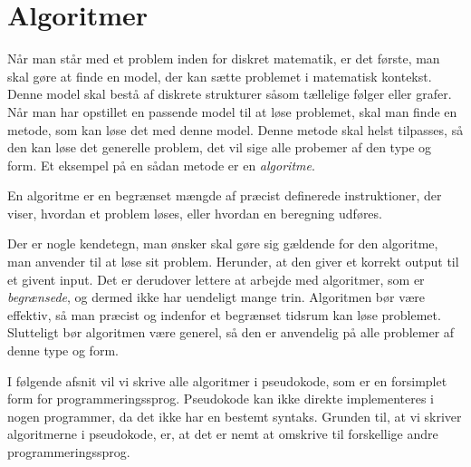 \chapter{Algoritmer} \label{kap.algo}
Når man står med et problem inden for diskret matematik, er det første, man skal gøre at finde en model, der kan sætte problemet i matematisk kontekst. Denne model skal bestå af diskrete strukturer såsom tællelige følger eller grafer. Når man har opstillet en passende model til at løse problemet, skal man finde en metode, som kan løse det med denne model. Denne metode skal helst tilpasses, så den kan løse det generelle problem, det vil sige alle probemer af den type og form. Et eksempel på en sådan metode er en \emph{algoritme}.
\begin{defn}
[Algoritmer] En algoritme er en begrænset mængde af præcist definerede instruktioner, der viser, hvordan et problem løses, eller hvordan en beregning udføres. 
\end{defn}

Der er nogle kendetegn, man ønsker skal gøre sig gældende for den algoritme, man anvender til at løse sit problem. Herunder, at den giver et korrekt output til et givent input. Det er derudover lettere at arbejde med algoritmer, som er \emph{begrænsede}, og dermed ikke har uendeligt mange trin. Algoritmen bør være effektiv, så man præcist og indenfor et begrænset tidsrum kan løse problemet. Slutteligt bør algoritmen være generel, så den er anvendelig på alle problemer af denne type og form.

I følgende afsnit vil vi skrive alle algoritmer i pseudokode, som er en forsimplet form for programmeringssprog. Pseudokode kan ikke direkte implementeres i nogen programmer, da det ikke har en bestemt syntaks. Grunden til, at vi skriver algoritmerne i pseudokode, er, at det er nemt at omskrive til forskellige andre programmeringssprog.







